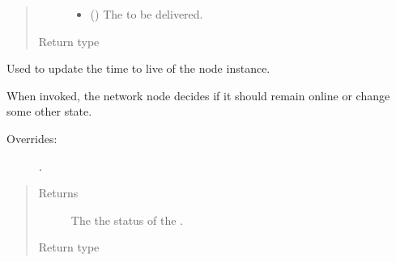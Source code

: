 \documentclass[letterpaper,10pt,english]{sphinxmanual}
\begin{document}
\begin{fulllineitems}
\begin{fulllineitems}
\begin{quote}
\begin{description}
\begin{itemize}
\item {} 
 ({\hyperref[\detokenize{app.domain.helpers:app.domain.helpers.smart_dataclasses.FileBlockData}]{}}) \textendash{} The {\hyperref[\detokenize{app.domain.helpers:app.domain.helpers.smart_dataclasses.FileBlockData}]{}}
to be delivered.

\end{itemize}

\item[{Return type}] \leavevmode
{}

\end{description}\end{quote}

\end{fulllineitems}


\begin{fulllineitems}
\label{\detokenize{app.domain:app.domain.network_nodes.HDFSNode.update_status}}
Used to update the time to live of the node instance.

When invoked, the network node decides if it should remain online or
change some other state.
\begin{description}
\item[{Overrides:}] \leavevmode
{\hyperref[\detokenize{app.domain:app.domain.network_nodes.Node.update_status}]{}}.

\end{description}
\begin{quote}\begin{description}
\item[{Returns}] \leavevmode
The the status of the .

\item[{Return type}] \leavevmode
{\hyperref[\detokenize{app.domain.helpers:app.domain.helpers.enums.Status}]{}}

\end{description}\end{quote}

\end{fulllineitems}


\end{fulllineitems}
\end{document}
